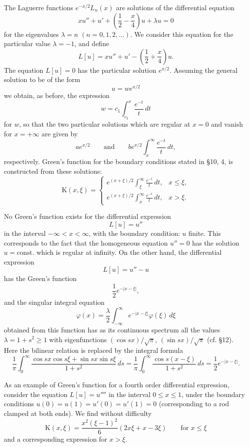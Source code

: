 The Laguerre functions $e^{-x/2}L_n(x)$ are solutions of the differential equation
\[
xu''+u'+\left(\frac12-\frac{x}{4}\right)u+\lambda u=0
\]
for the eigenvalues $\lambda=n$ $(n=0,1,2,\ldots)$. We consider this equation for the particular value $\lambda=-1$, and define
\[
L[u]=xu''+u'-\left(\frac12+\frac{x}{4}\right)u.
\]
The equation $L[u]=0$ has the particular solution $e^{x/2}$. Assuming the general solution to be of the form
\[
u=we^{x/2}
\]
we obtain, as before, the expression
\[
w=c_1\int_{c_2}^{x}\frac{e^{-t}}{t}\,dt
\]
for $w$, so that the two particular solutions which are regular at $x=0$ and vanish for $x=+\infty$ are given by
\[
ae^{x/2}
\qquad\text{and}\qquad
be^{x/2}\int_x^{\infty}\frac{e^{-t}}{t}\,dt,
\]
respectively. Green's function for the boundary conditions stated in \S10, 4, is constructed from these solutions:
\[
\mathrm K(x,\xi)=
\begin{cases}
\displaystyle e^{(x+\xi)/2}\int_{\xi}^{\infty}\frac{e^{-t}}{t}\,dt,&x\le\xi,\\[1.1em]
\displaystyle e^{(x+\xi)/2}\int_{x}^{\infty}\frac{e^{-t}}{t}\,dt,&x>\xi.
\end{cases}
\]

No Green's function exists for the differential expression
\[
L[u]=u''
\]
in the interval $-\infty<x<\infty$, with the boundary condition: $u$ finite. This corresponds to the fact that the homogeneous equation $u''=0$ has the solution $u=\mathrm{const.}$ which is regular at infinity. On the other hand, the differential expression
\[
L[u]=u''-u
\]
has the Green's function
\[
\frac12e^{-|x-\xi|},
\]
and the singular integral equation
\[
\varphi(x)=\frac{\lambda}{2}\int_{-\infty}^{\infty}e^{-|x-\xi|}\varphi(\xi)\,d\xi
\]
obtained from this function has as its continuous spectrum all the values $\lambda=1+s^2\ge1$ with eigenfunctions $(\cos sx)/\sqrt\pi$, $(\sin sx)/\sqrt\pi$ (cf. \S12). Here the bilinear relation is replaced by the integral formula
\[
\frac1\pi\int_0^{\infty}\frac{\cos sx\cos s\xi+\sin sx\sin s\xi}{1+s^2}\,ds
=\frac1\pi\int_0^{\infty}\frac{\cos s(x-\xi)}{1+s^2}\,ds
=\frac12e^{-|x-\xi|}.
\]

As an example of Green's function for a fourth order differential expression, consider the equation $L[u]=u''''$ in the interval $0\le x\le1$, under the boundary conditions $u(0)=u(1)=u'(0)=u'(1)=0$ (corresponding to a rod clamped at both ends). We find without difficulty
\[
\mathrm K(x,\xi)=\frac{x^2(\xi-1)^2}{6}(2x\xi+x-3\xi)\qquad\text{for }x\le\xi
\]
and a corresponding expression for $x>\xi$.

